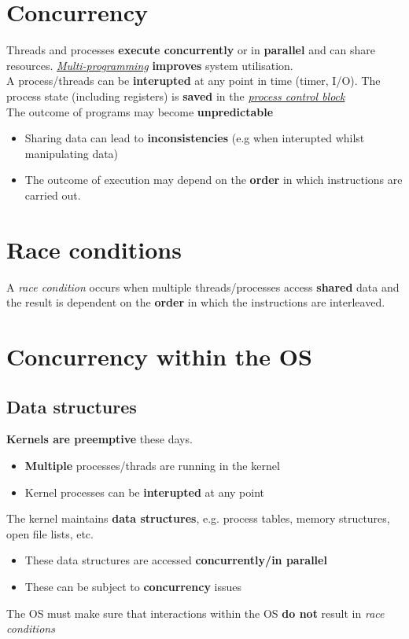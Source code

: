 \documentclass{article}
\newcommand{\worddef}[1]{\hyperref[sec:reference]{\textit{#1}}}
\begin{document}
\section{Concurrency}
\begin{flushleft}
Threads and processes \textbf{execute concurrently} or in \textbf{parallel} and can share resources. \worddef{Multi-programming} \textbf{improves} system utilisation.\\
A process/threads can be \textbf{interupted} at any point in time (timer, I/O). The process state (including registers) is \textbf{saved} in the \worddef{process control block}\\
The outcome of programs may become \textbf{unpredictable}
\begin{itemize}
	\item Sharing data can lead to \textbf{inconsistencies} (e.g when interupted whilst manipulating data)
	\item The outcome of execution may depend on the \textbf{order} in which instructions are carried out.
\end{itemize}
\end{flushleft}

\section{Race conditions}
\begin{flushleft}
A \textit{race condition} occurs when multiple threads/processes access \textbf{shared} data and the result is dependent on the \textbf{order} in which the instructions are interleaved.
\end{flushleft}

\section{Concurrency within the OS}

\subsection{Data structures}
\begin{flushleft}
\textbf{Kernels are preemptive} these days.
\begin{itemize}
	\item \textbf{Multiple} processes/thrads are running in the kernel
	\item Kernel processes can be \textbf{interupted} at any point
\end{itemize}
The kernel maintains \textbf{data structures}, e.g. process tables, memory structures, open file lists, etc.
\begin{itemize}
	\item These data structures are accessed \textbf{concurrently/in parallel}
	\item These can be subject to \textbf{concurrency} issues
\end{itemize}
The OS must make sure that interactions within the OS \textbf{do not} result in \textit{race conditions}
\end{flushleft}
\end{document}
